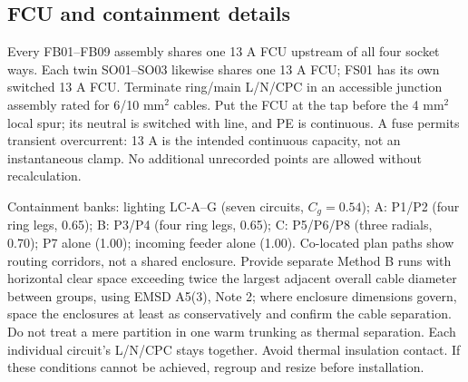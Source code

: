\subsection*{FCU and containment details}
Every FB01--FB09 assembly shares one 13 A FCU upstream of all four socket ways. Each twin SO01--SO03 likewise shares one 13 A FCU; FS01 has its own switched 13 A FCU. Terminate ring/main L/N/CPC in an accessible junction assembly rated for 6/10 mm$^2$ cables. Put the FCU at the tap before the 4 mm$^2$ local spur; its neutral is switched with line, and PE is continuous. A fuse permits transient overcurrent: 13 A is the intended continuous capacity, not an instantaneous clamp. No additional unrecorded points are allowed without recalculation.

Containment banks: lighting LC-A--G (seven circuits, $C_g=0.54$); A: P1/P2 (four ring legs, 0.65); B: P3/P4 (four ring legs, 0.65); C: P5/P6/P8 (three radials, 0.70); P7 alone (1.00); incoming feeder alone (1.00). Co-located plan paths show routing corridors, not a shared enclosure. Provide separate Method B runs with horizontal clear space exceeding twice the largest adjacent overall cable diameter between groups, using EMSD A5(3), Note 2; where enclosure dimensions govern, space the enclosures at least as conservatively and confirm the cable separation. Do not treat a mere partition in one warm trunking as thermal separation. Each individual circuit's L/N/CPC stays together. Avoid thermal insulation contact. If these conditions cannot be achieved, regroup and resize before installation.
